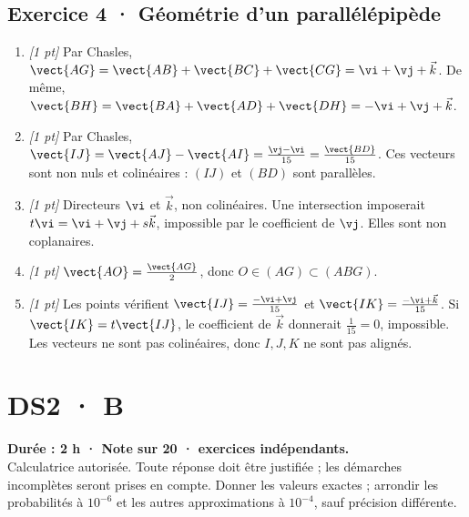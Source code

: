 \subsection*{Exercice 4 · Géométrie d'un parallélépipède}\begin{enumerate}

\item \textit{[1 pt]} Par Chasles, $\vect{AG}=\vect{AB}+\vect{BC}+\vect{CG}=\vi +\vj +\vec k$. De même, $\vect{BH}=\vect{BA}+\vect{AD}+\vect{DH}=-\vi +\vj +\vec k$.

\item \textit{[1 pt]} Par Chasles, $\vect{IJ}=\vect{AJ}-\vect{AI}=\frac{\vj -\vi }{15}=\frac{\vect{BD}}{15}$. Ces vecteurs sont non nuls et colinéaires : $(IJ)$ et $(BD)$ sont parallèles.

\item \textit{[1 pt]} Directeurs $\vi $ et $\vec k$, non colinéaires. Une intersection imposerait $t\vi =\vi +\vj +s\vec k$, impossible par le coefficient de $\vj $. Elles sont non coplanaires.

\item \textit{[1 pt]} $\vect{AO}=\frac{\vect{AG}}{2}$, donc $O\in(AG)\subset(ABG)$.

\item \textit{[1 pt]} Les points vérifient $\vect{IJ}=\frac{-\vi +\vj }{15}$ et $\vect{IK}=\frac{-\vi +\vec k}{15}$. Si $\vect{IK}=t\vect{IJ}$, le coefficient de $\vec k$ donnerait $\frac{1}{15}=0$, impossible. Les vecteurs ne sont pas colinéaires, donc $I,J,K$ ne sont pas alignés.

\end{enumerate}

\fi

\fi

\ifmxteacher

\mxnewpage{}\label{sujet:2-4}

\section*{DS2 · B}


\textbf{Durée : 2 h · Note sur 20 ·  exercices indépendants.}\\Calculatrice autorisée. Toute réponse doit être justifiée ; les démarches incomplètes seront prises en compte. Donner les valeurs exactes ; arrondir les probabilités à $10^{-6}$ et les autres approximations à $10^{-4}$, sauf précision différente.

